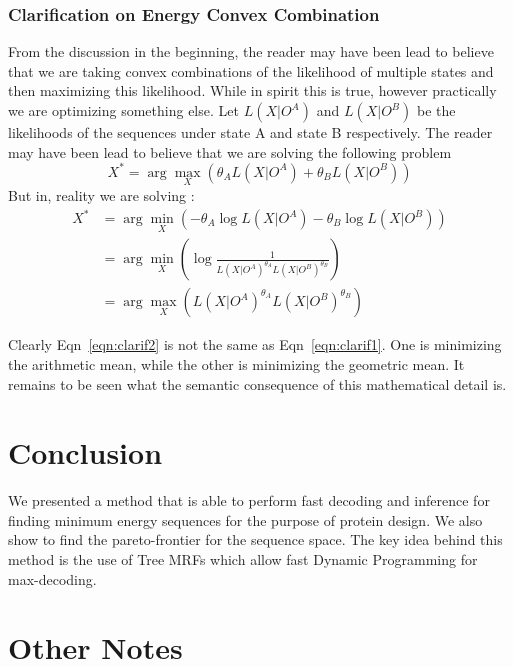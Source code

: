 \documentclass{article}
\begin{document}
\subsubsection{Clarification on Energy Convex Combination}
From the discussion in the beginning, the reader may have been lead to believe that we are taking convex combinations of the likelihood of multiple states and then maximizing this likelihood. While in spirit this is true, however practically we are optimizing something else. Let $L(X|O^A)$  and $L(X|O^B)$ be the likelihoods of the sequences under state A and state B respectively. The reader may have been lead to believe that we are solving the following problem
\begin{equation}
\label{eqn:clarif1}
X^* = \arg \max_X \left( \theta_A L(X|O^A) + \theta_B L(X|O^B) \right)
\end{equation}
But in, reality we are solving : 
\begin{align}
X^* &= \arg \min_X \left( -\theta_A \log L(X|O^A) - \theta_B \log L(X|O^B) \right) \\
&= \arg \min_X \left( \log \frac{1}{L(X|O^A)^{\theta_A} L(X|O^B)^{\theta_B}} \right) \\
&= \arg \max_X \left( L(X|O^A)^{\theta_A} L(X|O^B)^{\theta_B} \right)
\label{eqn:clarif2} 
\end{align}

Clearly Eqn~\ref{eqn:clarif2} is not the same as Eqn~\ref{eqn:clarif1}. One is minimizing the arithmetic mean, while the other is minimizing the geometric mean. It remains to be seen what the semantic consequence of this mathematical detail is. 



\section{Conclusion}
We presented a method that is able to perform fast decoding and inference for finding minimum energy sequences for the purpose of protein design. We also show to find the pareto-frontier for the sequence space. The key idea behind this method is the use of Tree MRFs which allow fast Dynamic Programming for max-decoding.





\appendix

\section{Other Notes}
\end{document}
